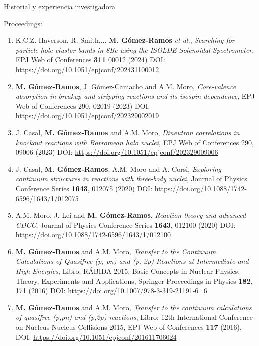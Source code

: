 \documentclass{resume2} %
\begin{document}
\begin{rSection}{Historial y experiencia investigadora}
\begin{enumerate}[label=\alph*.]
\begin{enumerate}[label=\arabic*.]
\end{enumerate}

{\sc Proceedings:}

\begin{enumerate}[label=\arabic*.]

\item K.C.Z. Haverson, R. Smith,... {\bf M. G\'omez-Ramos} \textit{et al.},  {\it Searching for particle-hole cluster bands in 8Be using the ISOLDE Solenoidal Spectrometer}, EPJ Web of Conferences {\bf 311} 00012 (2024) DOI: \url{https://doi.org/10.1051/epjconf/202431100012}

\item {\bf M. G\'omez-Ramos}, J. G\'omez-Camacho and  A.M. Moro,  {\it Core-valence absorption in breakup and stripping reactions and its isospin dependence}, EPJ Web of Conferences 290, 02019 (2023) DOI: \url{https://doi.org/10.1051/epjconf/202329002019}

\item J. Casal, {\bf M. G\'omez-Ramos} and  A.M. Moro,  {\it Dineutron correlations in knockout reactions with Borromean halo nuclei}, EPJ Web of Conferences 290, 09006 (2023) DOI: \url{https://doi.org/10.1051/epjconf/202329009006}

\item J. Casal, {\bf M. G\'omez-Ramos},  A.M. Moro and A. Corsi, {\it Exploring continuum structures in reactions with three-body nuclei},  Journal of Physics Conference Series {\bf 1643}, 012075 (2020) DOI: \url{https://doi.org/10.1088/1742-6596/1643/1/012075}

\item A.M. Moro, J. Lei and {\bf M. G\'omez-Ramos}, {\it Reaction theory and advanced CDCC},  Journal of Physics Conference Series {\bf 1643}, 012100 (2020) DOI: \url{https://doi.org/10.1088/1742-6596/1643/1/012100}

\item {\bf M. G\'omez-Ramos} and A.M. Moro, {\it Transfer to the Continuum Calculations of Quasifree (p, pn) and (p, 2p) Reactions at Intermediate and High Energies}, Libro: R\'ABIDA 2015: Basic Concepts in Nuclear Physics: Theory, Experiments and Applications,  Springer Proceedings in Physics {\bf 182}, 171 (2016) DOI: \url{https://doi.org/10.1007/978-3-319-21191-6_6} 

\item {\bf M. G\'omez-Ramos} and A.M. Moro, {\it Transfer to the continuum calculations of quasifree (p,pn) and (p,2p) reactions}, Libro: 12th International Conference on Nucleus-Nucleus Collisions 2015, EPJ Web of Conferences {\bf 117} (2016), DOI: \url{https://doi.org/10.1051/epjconf/201611706024}


\end{enumerate}
\end{enumerate}
\end{rSection}
\end{document}

